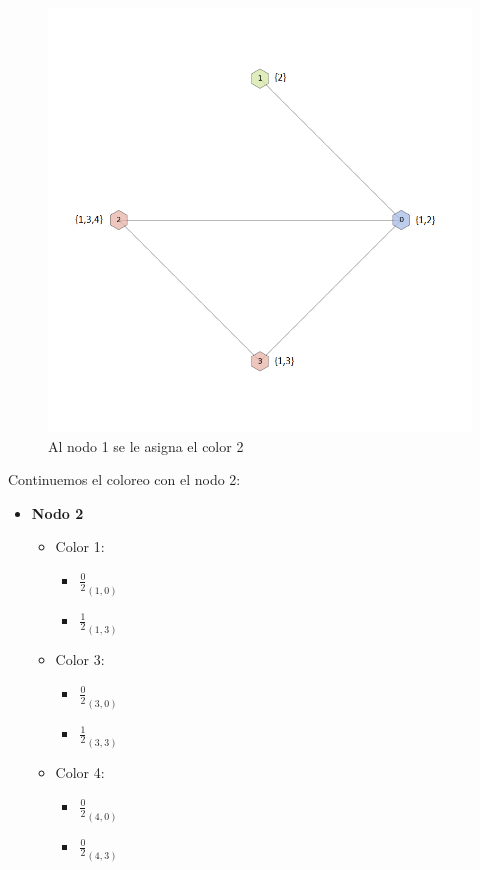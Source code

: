  \begin{figure}[H]
    \begin{center}
  	\includegraphics[width=13cm]{imagenes/ej3/4Nodos2.png}
 	\caption{Al nodo 1 se le asigna el color 2}
 	\label{2colores}
    \end{center}
  \end{figure}

Continuemos el coloreo con el nodo 2: \\

\begin{itemize}
	\item \textbf{Nodo 2}
	\begin{itemize}
		\item Color 1:
		\begin{itemize}
			\item  $\frac{0}{2}_{(1,0)}$
			\item  $\frac{1}{2}_{(1,3)}$
		\end{itemize}

		\item Color 3:
		\begin{itemize}
			\item  $\frac{0}{2}_{(3,0)}$
			\item  $\frac{1}{2}_{(3,3)}$
		\end{itemize}

		\item Color 4:
		\begin{itemize}
			\item  $\frac{0}{2}_{(4,0)}$
			\item  $\frac{0}{2}_{(4,3)}$
		\end{itemize}
	\end{itemize}
\end{itemize}

